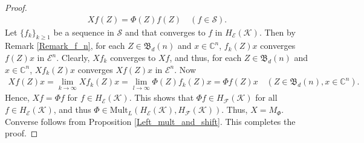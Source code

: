 \documentclass[12pt]{amsart}%
\numberwithin{equation}{section}
\newcommand{\fB}{{\mathfrak{B}}}
\newcommand{\cle}{\mathcal{E}}
\newcommand{\clf}{\mathcal{F}}
\newcommand{\clk}{\mathcal{K}}
\newcommand{\cls}{\mathcal{S}}
\newcommand{\C}{\mathbb{C}}
\begin{document}
\begin{proof}
\begin{align}
Xf(Z)=\Phi(Z)f(Z) \quad (f\in \cls).
\end{align}
Let $\{f_k\}_{k\geq 1}$ be a sequence in $\cls$ and that converges to $f$ in $H_\cle(\clk)$. Then by Remark \ref{Remark_f_n}, for each $Z\in \fB_d(n)$ and $x\in \C^n$, $f_k(Z)x$ converges  $f(Z)x$ in  $\cle^n$. Clearly, $X f_k$ converges to $X f$, and thus, for each $Z\in \fB_d(n)$ and $x\in \C^n$, $Xf_k(Z)x$ converges  $Xf(Z)x$ in  $\cle^n$. 
Now 
\begin{align*}
Xf(Z)x=\lim_{k\to \infty} X f_k(Z)x= \lim_{l\to \infty}\Phi(Z) f_k(Z)x=\Phi f(Z)x  \quad (Z\in \fB_d(n), x\in \C^n).
\end{align*}
Hence, $Xf=\Phi f$ for $f\in H_\cle(\clk)$. This shows that $\Phi f\in H_\clf(\clk)$ for all $f\in H_\cle(\clk)$, and thus $\Phi\in \text{Mult}_L(H_\cle(\clk), H_\clf(\clk))$. Thus, $X=M_{\Phi}$.
Converse follows from Proposition \ref{Left_mult_and_shift}. This completes the proof.
\end{proof}
\end{document}

